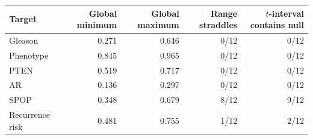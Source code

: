 \begingroup
\small
\captionsetup{justification=raggedright,singlelinecheck=false}
\begin{center}
\begin{minipage}{0.98\textwidth}
\label{tab:supp-stability-summary}
\centering
\begin{tabular}{@{}lrrrr@{}}
\toprule
Target & Global minimum & Global maximum & Range straddles & $t$-interval contains null \\
\midrule
Gleason & 0.271 & 0.646 & 0/12 & 0/12 \\
Phenotype & 0.845 & 0.965 & 0/12 & 0/12 \\
PTEN & 0.519 & 0.717 & 0/12 & 0/12 \\
AR & 0.136 & 0.297 & 0/12 & 0/12 \\
SPOP & 0.348 & 0.679 & 8/12 & 9/12 \\
Recurrence risk & 0.481 & 0.755 & 1/12 & 2/12 \\
\bottomrule
\end{tabular}
\end{minipage}
\end{center}
\endgroup
